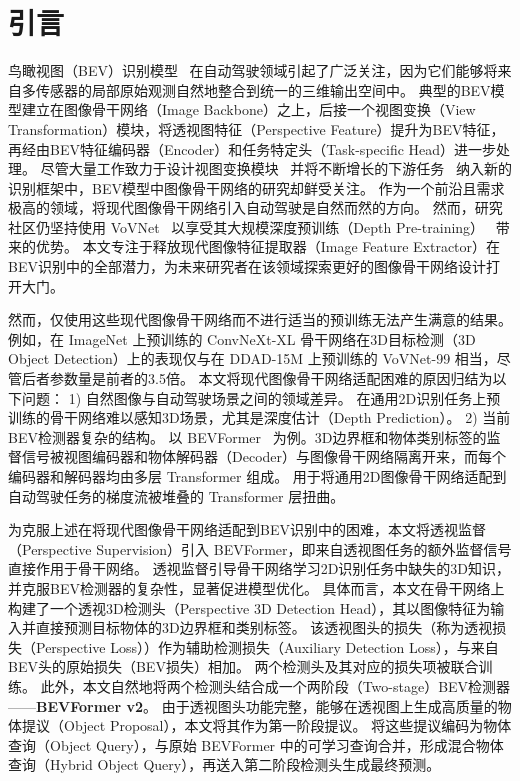 \vspace{-5pt}
\section{引言}
鸟瞰视图（BEV）识别模型~\cite{OFT,pseudo-lidar,VPN,LSS,bevformer,CVT,PETR} 在自动驾驶领域引起了广泛关注，因为它们能够将来自多传感器的局部原始观测自然地整合到统一的三维输出空间中。
典型的BEV模型建立在图像骨干网络（Image Backbone）之上，后接一个视图变换（View Transformation）模块，将透视图特征（Perspective Feature）提升为BEV特征，再经由BEV特征编码器（Encoder）和任务特定头（Task-specific Head）进一步处理。
尽管大量工作致力于设计视图变换模块~\cite{CVT,LSS,bevformer} 并将不断增长的下游任务~\cite{LSS,fiery} 纳入新的识别框架中，BEV模型中图像骨干网络的研究却鲜受关注。
作为一个前沿且需求极高的领域，将现代图像骨干网络引入自动驾驶是自然而然的方向。
然而，研究社区仍坚持使用 VoVNet~\cite{Vovnet} 以享受其大规模深度预训练（Depth Pre-training）~\cite{DD3D} 带来的优势。
本文专注于释放现代图像特征提取器（Image Feature Extractor）在BEV识别中的全部潜力，为未来研究者在该领域探索更好的图像骨干网络设计打开大门。

然而，仅使用这些现代图像骨干网络而不进行适当的预训练无法产生满意的结果。
例如，在 ImageNet \cite{ImageNet} 上预训练的 ConvNeXt-XL \cite{ConvNext} 骨干网络在3D目标检测（3D Object Detection）上的表现仅与在 DDAD-15M 上预训练的 VoVNet-99 \cite{DD3D} 相当，尽管后者参数量是前者的3.5倍。
本文将现代图像骨干网络适配困难的原因归结为以下问题：
1) 自然图像与自动驾驶场景之间的领域差异。
在通用2D识别任务上预训练的骨干网络难以感知3D场景，尤其是深度估计（Depth Prediction）。
2) 当前BEV检测器复杂的结构。
以 BEVFormer~\cite{bevformer} 为例。3D边界框和物体类别标签的监督信号被视图编码器和物体解码器（Decoder）与图像骨干网络隔离开来，而每个编码器和解码器均由多层 Transformer 组成。
用于将通用2D图像骨干网络适配到自动驾驶任务的梯度流被堆叠的 Transformer 层扭曲。

为克服上述在将现代图像骨干网络适配到BEV识别中的困难，本文将透视监督（Perspective Supervision）引入 BEVFormer，即来自透视图任务的额外监督信号直接作用于骨干网络。
透视监督引导骨干网络学习2D识别任务中缺失的3D知识，并克服BEV检测器的复杂性，显著促进模型优化。
具体而言，本文在骨干网络上构建了一个透视3D检测头（Perspective 3D Detection Head）\cite{DD3D}，其以图像特征为输入并直接预测目标物体的3D边界框和类别标签。
该透视图头的损失（称为透视损失（Perspective Loss））作为辅助检测损失（Auxiliary Detection Loss），与来自BEV头的原始损失（BEV损失）相加。
两个检测头及其对应的损失项被联合训练。
此外，本文自然地将两个检测头结合成一个两阶段（Two-stage）BEV检测器——\textbf{BEVFormer v2}。
由于透视图头功能完整，能够在透视图上生成高质量的物体提议（Object Proposal），本文将其作为第一阶段提议。
将这些提议编码为物体查询（Object Query），与原始 BEVFormer 中的可学习查询合并，形成混合物体查询（Hybrid Object Query），再送入第二阶段检测头生成最终预测。

